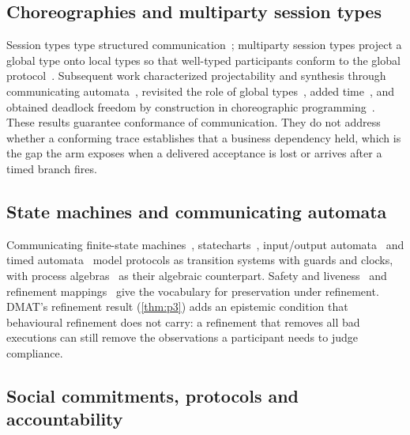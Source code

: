 \subsection{Choreographies and multiparty session types}

Session types type structured communication~\cite{honda1998language}; multiparty session types project a global type onto local types so that well-typed participants conform to the global protocol~\cite{honda2008mpst,honda2016mpst}. Subsequent work characterized projectability and synthesis through communicating automata~\cite{denielou2013multiparty,li2023complete}, revisited the role of global types~\cite{scalas2019less,hou2026less}, added time~\cite{bocchi2014timed}, and obtained deadlock freedom by construction in choreographic programming~\cite{carbone2013deadlock}. These results guarantee conformance of communication. They do not address whether a conforming trace establishes that a business dependency held, which is the gap the  arm exposes when a delivered acceptance is lost or arrives after a timed branch fires.

\subsection{State machines and communicating automata}

Communicating finite-state machines~\cite{brand1983communicating}, statecharts~\cite{harel1987statecharts}, input/output automata~\cite{lynch1989ioa} and timed automata~\cite{alur1994timed} model protocols as transition systems with guards and clocks, with process algebras~\cite{hoare1985csp} as their algebraic counterpart. Safety and liveness~\cite{alpern1985liveness} and refinement mappings~\cite{abadi1991refinement} give the vocabulary for preservation under refinement. DMAT's refinement result (\cref{thm:p3}) adds an epistemic condition that behavioural refinement does not carry: a refinement that removes all bad executions can still remove the observations a participant needs to judge compliance.

\subsection{Social commitments, protocols and accountability}

